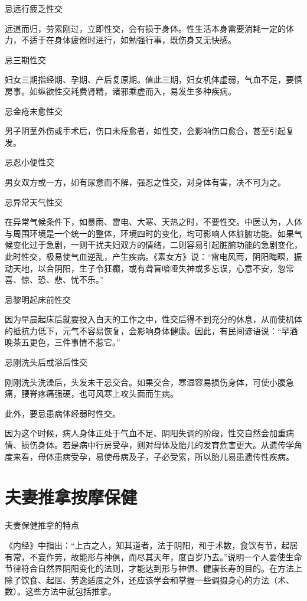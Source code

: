 \documentclass[12pt,UTF8,openany]{ctexbook}
\begin{document}
忌远行疲乏性交

远道而归，劳累刚过，立即性交，会有损于身体。性生活本身需要消耗一定的体力，不适于在身体疲倦时进行，如勉强行事，既伤身又无快感。

忌三期性交

妇女三期指经期、孕期、产后复原期。值此三期，妇女机体虚弱，气血不足，要慎房事。如纵欲性交耗费肾精，诸邪乘虚而入，易发生多种疾病。

忌金疮未愈性交

男子阴茎外伤或手术后，伤口未痊愈者，如性交，会影响伤口愈合，甚至引起复发。

忌忍小便性交

男女双方或一方，如有尿意而不解，强忍之性交，对身体有害，决不可为之。

忌异常天气性交

在异常气候条件下，如暴雨、雷电、大寒、天热之时，不要性交。中医认为，人体与周围环境是一个统一的整体，环境四时的变化，均可影响人体脏腑功能。如果气候变化过于急剧，一则干扰夫妇双方的情绪，二则容易引起脏腑功能的急剧变化，此时性交，极易使气血逆乱，产生疾病。《素女方》说：“雷电风雨，阴阳晦暝，振动天地，以合阴阳，生子令狂癫，或有聋盲喑哑失神或多忘误，心意不安，忽常喜、惊、恐、悲、忧不乐。”

忌黎明起床前性交

因为早晨起床后就要投入白天的工作之中，性交后得不到充分的休息，从而使机体的抵抗力低下，元气不容易恢复，会影响身体健康。因此，有民间谚语说：“早酒晚茶五更色，三件事情不惹它。”

忌刚洗头后或浴后性交

刚刚洗头洗澡后，头发未干忌交合。如果交合，寒湿容易损伤身体，可使小腹急痛，腰脊疼痛强硬，也可风寒上攻头面而生病。

此外，要忌患病体经弱时性交。

因为这个时候，病人身体正处于气血不足、阴阳失调的阶段，性交自然会加重病情、损伤身体。若是病中行房受孕，则对母体及胎儿的发育危害更大。从遗传学角度来看，母体患病受孕，易使母病及子，子必受累，所以胎儿易患遗传性疾病。





\chapter{夫妻推拿按摩保健}


夫妻保健推拿的特点


《内经》中指出：“上古之人，知其道者，法于阴阳，和于术数，食饮有节，起居有常，不妄作劳，故能形与神俱，而尽其天年，度百岁乃去。”说明一个人要使生命节律符合自然界阴阳变化的法则，才能达到形与神俱、健康长寿的目的。在方法上除了饮食、起居、劳逸适度之外，还应该学会和掌握一些调摄身心的方法（术、数）。这些方法中就包括推拿。
\end{document}

